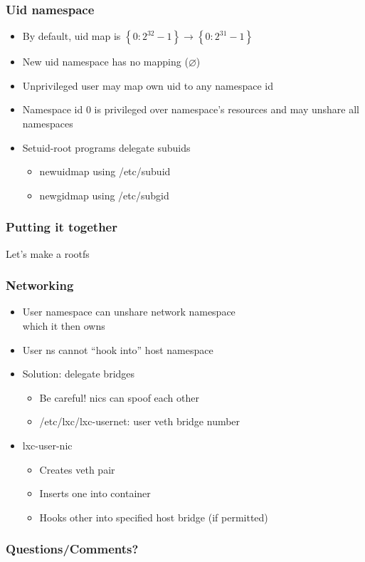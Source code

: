 \documentclass{beamer}
\begin{document}
\begin{frame}
\frametitle{Uid namespace}
	\begin{itemize}
	\item By default, uid map is $\left\{0:2^{32}-1\right\} \rightarrow \left\{ 0:2^{31}-1\right\}$
	\item New uid namespace has no mapping ($\varnothing$)
	\item Unprivileged user may map own uid to any namespace id
	\item Namespace id 0 is privileged over namespace's resources and may unshare all namespaces
	\item Setuid-root programs delegate subuids
		\begin{itemize}
		\item newuidmap using /etc/subuid
		\item newgidmap using /etc/subgid
		\end{itemize}
	\end{itemize}

\end{frame}

\begin{frame}
\frametitle{Putting it together}
Let's make a rootfs
\end{frame}

\begin{frame}
\frametitle{Networking}
	\begin{itemize}
	\item User namespace can unshare network namespace \\
		which it then owns
	\item User ns cannot ``hook into'' host namespace
	\item Solution: delegate bridges
		\begin{itemize}
		\item Be careful! nics can spoof each other
		\item /etc/lxc/lxc-usernet: user veth bridge number
		\end{itemize}
	\item lxc-user-nic
		\begin{itemize}
		\item Creates veth pair
		\item Inserts one into container
		\item Hooks other into specified host bridge (if permitted)
		\end{itemize}
	\end{itemize}
\end{frame}

\begin{frame}
\frametitle{Questions/Comments?}
\end{frame}

\end{document}
